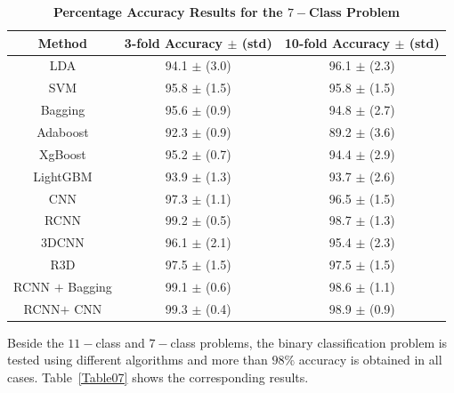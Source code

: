 \documentclass{ieeeaccess}
\begin{document}
\begin{table}
\caption{\textbf{Percentage Accuracy Results for the $7-$Class Problem}}
\label{Table06}
\setlength{\tabcolsep}{3pt}
\begin{center}
\begin{tabular}{|c|c|c|}
\hline
\textbf{Method}	& \textbf{3-fold Accuracy $\pm$ (std)}	& \textbf{10-fold Accuracy $\pm$ (std)} \\ \hline \hline
LDA	& 94.1 $\pm$ (3.0)	& 96.1 $\pm$ (2.3) \\ \hline
SVM	& 95.8 $\pm$ (1.5)	& 95.8 $\pm$ (1.5) \\ \hline
Bagging	& 95.6 $\pm$ (0.9)	& 94.8 $\pm$ (2.7) \\ \hline
Adaboost	& 92.3 $\pm$ (0.9)	& 89.2 $\pm$ (3.6) \\ \hline
XgBoost	& 95.2 $\pm$ (0.7)	& 94.4 $\pm$ (2.9) \\ \hline
LightGBM	& 93.9 $\pm$ (1.3)	& 93.7 $\pm$ (2.6) \\ \hline
CNN	& 97.3 $\pm$ (1.1)	& 96.5 $\pm$ (1.5) \\ \hline
RCNN	& 99.2 $\pm$ (0.5)	& 98.7 $\pm$ (1.3) \\ \hline
3DCNN	& 96.1 $\pm$ (2.1)	& 95.4 $\pm$ (2.3) \\ \hline
R3D	& 97.5 $\pm$ (1.5)	& 97.5 $\pm$ (1.5) \\ \hline
RCNN  $+$ Bagging	& 99.1 $\pm$ (0.6)	& 98.6 $\pm$ (1.1) \\ \hline
RCNN$+$ CNN	& 99.3 $\pm$ (0.4)	& 98.9 $\pm$ (0.9) \\
\hline
\end{tabular}
\end{center}
\end{table}


Beside the $11-$class and $7-$class problems, the binary classification problem is tested using different algorithms and more than $98\%$ accuracy is obtained in all cases. Table~\ref{Table07} shows the corresponding results.
\end{document}
